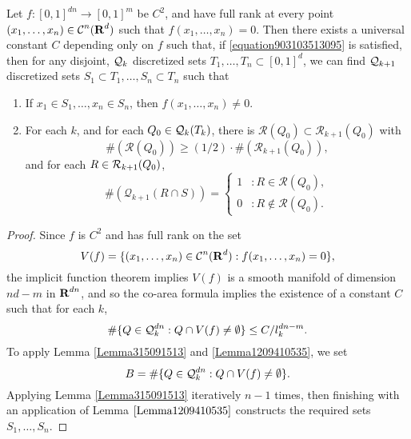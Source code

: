 \begin{corollary} \label{PramanikFraserBuildingBlockLemma}
    Let $f: [0,1]^{dn} \to [0,1]^m$ be $C^2$, and have full rank at every point $(x_1, \dots, x_n) \in \operatorname{\mathcal{C}}^n(\operatorname{\mathbf{R}}^d)$ such that $f(x_1, \dots, x_n) = 0$. Then there exists a universal constant $C$ depending only on $f$ such that, if \eqref{equation903103513095} is satisfied, then for any disjoint, $\operatorname{\mathcal{Q}}_k$ discretized sets $T_1, \dots, T_n \subset [0,1]^d$, we can find $\operatorname{\mathcal{Q}}_{k+1}$ discretized sets $S_1 \subset T_1, \dots, S_n \subset T_n$ such that
    \begin{enumerate}
        \item If $x_1 \in S_1, \dots, x_n \in S_n$, then $f(x_1, \dots, x_n) \neq 0$.
        \item For each $k$, and for each $Q_0 \in \operatorname{\mathcal{Q}}_k(T_k)$, there is $\mathcal{R}(Q_0) \subset \mathcal{R}_{k+1}(Q_0)$ with
        \[ \#(\mathcal{R}(Q_0)) \geq (1/2) \cdot \#(\mathcal{R}_{k+1}(Q_0)), \]
        and for each $R \in \operatorname{\mathcal{R}}_{k+1}(Q_0)$,
        \[ \#(\mathcal{Q}_{k+1}(R \cap S)) = \begin{cases} 1 &: R \in \mathcal{R}(Q_0), \\ 0 &: R \not \in \mathcal{R}(Q_0). \end{cases} \]
    \end{enumerate}
\end{corollary}
\begin{proof}
    Since $f$ is $C^2$ and has full rank on the set
    \[ V(f) = \{ (x_1, \dots, x_n) \in \operatorname{\mathcal{C}}^n(\operatorname{\mathbf{R}}^d) : f(x_1, \dots, x_n) = 0 \}, \]
    the implicit function theorem implies $V(f)$ is a smooth manifold of dimension $nd - m$ in $\operatorname{\mathbf{R}}^{dn}$, and so the co-area formula implies the existence of a constant $C$ such that for each $k$,
    \[ \# \{ Q \in \operatorname{\mathcal{Q}}_k^{dn} : Q \cap V(f) \neq \emptyset \} \leq C/l_k^{dn-m}. \]
    To apply Lemma \ref{Lemma315091513} and \ref{Lemma1209410535}, we set
    \[ B = \# \{ Q \in \operatorname{\mathcal{Q}}_k^{dn} : Q \cap V(f) \neq \emptyset \}. \]
    Applying Lemma \ref{Lemma315091513} iteratively $n-1$ times, then finishing with an application of Lemma $\ref{Lemma1209410535}$ constructs the required sets $S_1, \dots, S_n$.
\end{proof}

